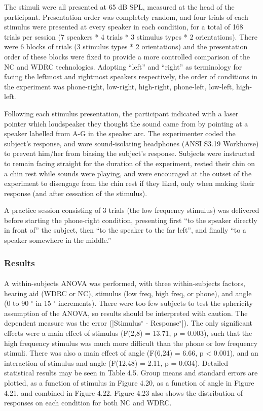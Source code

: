 The stimuli were all presented at 65 dB SPL, measured at the head of the participant.  Presentation order was completely random, and four trials of each stimulus were presented at every speaker in each condition, for a total of 168 trials per session (7 speakers * 4 trials * 3 stimulus types * 2 orientations).  There were 6 blocks of trials (3 stimulus types * 2 orientations) and the presentation order of these blocks were fixed to provide a more controlled comparison of the NC and WDRC technologies.  Adopting ``left'' and ``right'' as terminology for facing the leftmost and rightmost speakers respectively, the order of conditions in the experiment was phone-right, low-right, high-right, phone-left, low-left, high-left.

Following each stimulus presentation, the participant indicated with a laser pointer which loudspeaker they thought the sound came from by pointing at a speaker labelled from A-G in the speaker arc.  The experimenter coded the subject's response, and wore sound-isolating headphones (ANSI S3.19 Workhorse) to prevent him/her from biasing the subject's response. Subjects were instructed to remain facing straight for the duration of the experiment, rested their chin on a chin rest while sounds were playing, and were encouraged at the outset of the experiment to disengage from the chin rest if they liked, only when making their response (and after cessation of the stimulus).

A practice session consisting of 3 trials (the low frequency stimulus) was delivered before starting the phone-right condition, presenting first ``to the speaker directly in front of'' the subject, then ``to the speaker to the far left'', and finally ``to a speaker somewhere in the middle.''
\subsubsection{Results}
\paragraph{}A within-subjects ANOVA was performed, with three within-subjects factors, hearing aid (WDRC or NC), stimulus (low freq, high freq, or phone), and angle (0 to 90 $^\circ$ in 15 $^\circ$ increments).  There were too few subjects to test the sphericity assumption of the ANOVA, so results should be interpreted with caution.  The dependent measure was the error (|Stimulus$^\circ$ - Response$^\circ$|).  The only significant effects were a main effect of stimulus (F(2,8) = 13.71, p = 0.003), such that the high frequency stimulus was much more difficult than the phone or low frequency stimuli.  There was also a main effect of angle (F(6,24) = 6.66, p < 0.001), and an interaction of stimulus and angle (F(12,48) = 2.11, p = 0.034).  Detailed statistical results may be seen in Table 4.5.  Group means and standard errors are plotted, as a function of stimulus in Figure 4.20, as a function of angle in Figure 4.21, and combined in Figure 4.22.  Figure 4.23 also shows the distribution of responses on each condition for both NC and WDRC.

